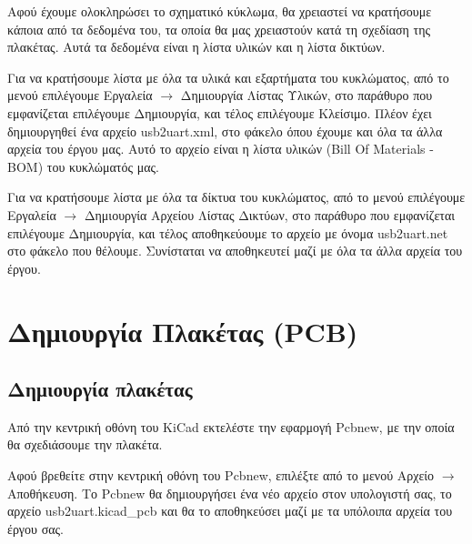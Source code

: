 \documentclass[a4paper]{article}
\begin{document}

Αφού έχουμε ολοκληρώσει το σχηματικό κύκλωμα, θα χρειαστεί να κρατήσουμε κάποια από τα δεδομένα του, τα οποία θα μας χρειαστούν κατά τη σχεδίαση της πλακέτας. Αυτά τα δεδομένα είναι η λίστα υλικών και η λίστα δικτύων.

Για να κρατήσουμε λίστα με όλα τα υλικά και εξαρτήματα του κυκλώματος, από το μενού επιλέγουμε Εργαλεία $\rightarrow$ Δημιουργία Λίστας Υλικών, στο παράθυρο που εμφανίζεται επιλέγουμε Δημιουργία, και τέλος επιλέγουμε Κλείσιμο. Πλέον έχει δημιουργηθεί ένα αρχείο usb2uart.xml, στο φάκελο όπου έχουμε και όλα τα άλλα αρχεία του έργου μας. Αυτό το αρχείο είναι η λίστα υλικών (Bill Of Materials - BOM) του κυκλώματός μας.

Για να κρατήσουμε λίστα με όλα τα δίκτυα του κυκλώματος, από το μενού επιλέγουμε Εργαλεία $\rightarrow$ Δημιουργία Αρχείου Λίστας Δικτύων, στο παράθυρο που εμφανίζεται επιλέγουμε Δημιουργία, και τέλος αποθηκεύουμε το αρχείο με όνομα usb2uart.net στο φάκελο που θέλουμε. Συνίσταται να αποθηκευτεί μαζί με όλα τα άλλα αρχεία του έργου.




\section{Δημιουργία Πλακέτας (PCB)}

\subsection{Δημιουργία πλακέτας}
Από την κεντρική οθόνη του \textenglish{KiCad} εκτελέστε την εφαρμογή \textenglish{Pcbnew}, με την οποία θα σχεδιάσουμε την πλακέτα.

\begin{figure}
  \begin{center}
    \label{fig:kicad-main}
  \end{center}
\end{figure}

Αφού βρεθείτε στην κεντρική οθόνη του \textenglish{Pcbnew}, επιλέξτε από το μενού Αρχείο $\rightarrow$ Αποθήκευση. Το \textenglish{Pcbnew} θα δημιουργήσει ένα νέο αρχείο στον υπολογιστή σας, το αρχείο usb2uart.kicad\_pcb και θα το αποθηκεύσει μαζί με τα υπόλοιπα αρχεία του έργου σας.
\end{document}
